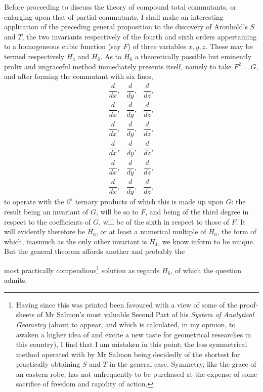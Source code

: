 \documentclass[11pt]{article}
\newcommand{\sourcepage}[1]{\marginpar{\scriptsize p.~#1}}
\begin{document}
Before proceeding to discuss the theory of compound total commutants, or enlarging upon that of partial commutants, I shall make an interesting application of the preceding general proposition to the discovery of Aronhold's $S$ and $T$, the two invariants respectively of the fourth and sixth orders appertaining to a homogeneous cubic function (say $F$) of three variables $x,y,z$. These may be termed respectively $H_4$ and $H_6$. As to $H_6$ a theoretically possible but eminently prolix and ungraceful method immediately presents itself, namely to take $F^2=G$, and after forming the commutant with six lines,
\[
\begin{array}{ccc}
\dfrac{d}{dx},&\dfrac{d}{dy},&\dfrac{d}{dz},\\[0.5em]
\dfrac{d}{dx},&\dfrac{d}{dy},&\dfrac{d}{dz},\\[0.5em]
\dfrac{d}{dx},&\dfrac{d}{dy},&\dfrac{d}{dz},\\[0.5em]
\dfrac{d}{dx},&\dfrac{d}{dy},&\dfrac{d}{dz},\\[0.5em]
\dfrac{d}{dx},&\dfrac{d}{dy},&\dfrac{d}{dz},\\[0.5em]
\dfrac{d}{dx},&\dfrac{d}{dy},&\dfrac{d}{dz},
\end{array}
\]
to operate with the $6^5$ ternary products of which this is made up upon $G$: the result being an invariant of $G$, will be so to $F$, and being of the third degree in respect to the coefficients of $G$, will be of the sixth in respect to those of $F$. It will evidently therefore be $H_6$, or at least a numerical multiple of $H_6$, the form of which, inasmuch as the only other invariant is $H_4$, we know inform to be unique. But the general theorem affords another and probably the

\sourcepage{309}
most practically compendious\footnote{Having since this was printed been favoured with a view of some of the proof-sheets of Mr Salmon's most valuable Second Part of his \emph{System of Analytical Geometry} (about to appear, and which is calculated, in my opinion, to awaken a higher idea of and excite a new taste for geometrical researches in this country), I find that I am mistaken in this point; the less symmetrical method operated with by Mr Salmon being decidedly of the shortest for practically obtaining $S$ and $T$ in the general case. Symmetry, like the grace of an eastern robe, has not unfrequently to be purchased at the expense of some sacrifice of freedom and rapidity of action.} solution as regards $H_6$, of which the question admits.
\end{document}
